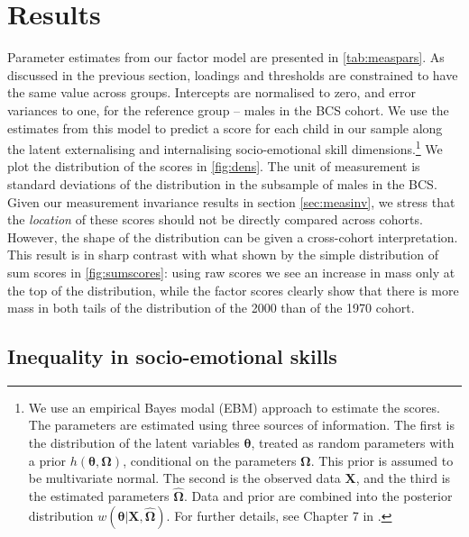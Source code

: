 

\section{Results}\label{sec:results}

Parameter estimates from our factor model are presented in \autoref{tab:measpars}. As discussed in the previous section, loadings and thresholds are constrained to have the same value across groups. Intercepts are normalised to zero, and error variances to one, for the reference group -- males in the BCS cohort. We use the estimates from this model to predict a score for each child in our sample along the latent externalising and internalising socio-emotional skill dimensions.\footnote{We use an empirical Bayes modal (EBM) approach to estimate the scores. The parameters are estimated using three sources of information. The first is the distribution of the latent variables $\bm{\theta}$, treated as random parameters with a prior $h(\bm{\theta}, \bm{\Omega})$, conditional on the parameters $\bm{\Omega}$. This prior is assumed to be multivariate normal. The second is the observed data $\bm{X}$, and the third is the estimated parameters $\hat{\bm{\Omega}}$. Data and prior are combined into the posterior distribution $w(\bm{\theta}| \bm{X}, \hat{\bm{\Omega}})$. For further details, see Chapter 7 in \citet{Skrondal2004}.} We plot the distribution of the scores in \autoref{fig:dens}. The unit of measurement is standard deviations of the distribution in the subsample of males in the BCS. Given our measurement invariance results in section \ref{sec:measinv}, we stress that the \emph{location} of these scores should not be directly compared across cohorts. However, the shape of the distribution can be given a cross-cohort interpretation. This result is in sharp contrast with what shown by the simple distribution of sum scores in \ref{fig:sumscores}: using raw scores we see an increase in mass only at the top of the distribution, while the factor scores clearly show that there is more mass in both tails of the distribution of the 2000 than of the 1970 cohort.

\subsection{Inequality in socio-emotional skills}

